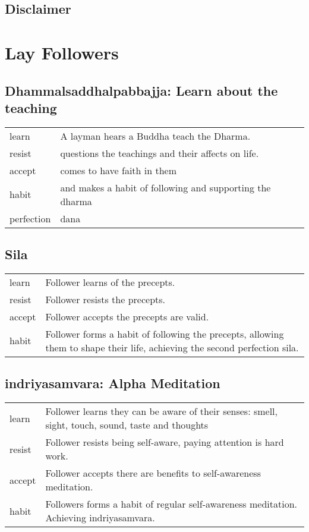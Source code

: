 \chapter{Disclaimer}

\part{Lay Followers}
%

\chapter{Dhammalsaddhalpabbajja: Learn about the teaching}
\begin{tabular}{ll}
learn &
A layman hears a Buddha teach the Dharma. \\
resist & 
questions the teachings and their affects on life. \\
accept &
comes to have faith in them \\
habit & 
and makes a habit of following and supporting the dharma \\
perfection &
dana \\
\end{tabular}



\chapter{Sila}
\begin{tabular}{lp{}}
  learn &Follower learns of the precepts.\\
resist & Follower resists the precepts.\\
accept & Follower accepts the precepts are valid.\\
habit & Follower forms a habit of following the precepts,
allowing them to shape their life, achieving the second perfection sila.\\
\end{tabular}



\chapter{indriyasamvara: Alpha Meditation}
\begin{tabular}{lp{}}
learn & Follower learns they can be aware of their senses: smell, sight, 
touch, sound, taste and thoughts\\
resist & Follower resists being self-aware, paying attention is hard
work.\\
accept & Follower accepts there are benefits to self-awareness
meditation.\\
habit & Followers forms a habit of regular self-awareness meditation.
Achieving indriyasamvara.\\
\end{tabular}


